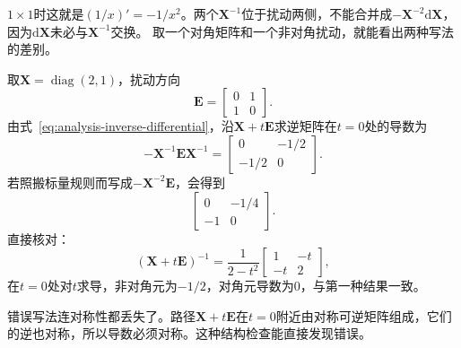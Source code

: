 $1\times1$时这就是$(1/x)'=-1/x^2$。两个$\bm{X}^{-1}$位于扰动两侧，不能合并成$-\bm{X}^{-2}\mathrm{d}\bm{X}$，因为$\mathrm{d}\bm{X}$未必与$\bm{X}^{-1}$交换。
取一个对角矩阵和一个非对角扰动，就能看出两种写法的差别。
\begin{example}[逆矩阵微分中的乘法次序]
\label{ex:analysis-noncommuting-inverse-differential}
取$\bm X=\operatorname{diag}(2,1)$，扰动方向
\[
 \bm E=\begin{bmatrix}0&1\\1&0\end{bmatrix}.
\]
由式~\eqref{eq:analysis-inverse-differential}，沿$\bm X+t\bm E$求逆矩阵在$t=0$处的导数为
\[
 -\bm X^{-1}\bm E\bm X^{-1}
 =\begin{bmatrix}0&-1/2\\-1/2&0\end{bmatrix}.
\]
若照搬标量规则而写成$-\bm X^{-2}\bm E$，会得到
\[
 \begin{bmatrix}0&-1/4\\-1&0\end{bmatrix}.
\]
直接核对：
\[
 (\bm X+t\bm E)^{-1}=\frac1{2-t^2}\begin{bmatrix}1&-t\\-t&2\end{bmatrix},
\]
在$t=0$处对$t$求导，非对角元为$-1/2$，对角元导数为$0$，与第一种结果一致。
\end{example}

错误写法连对称性都丢失了。路径$\bm X+t\bm E$在$t=0$附近由对称可逆矩阵组成，它们的逆也对称，所以导数必须对称。这种结构检查能直接发现错误。


